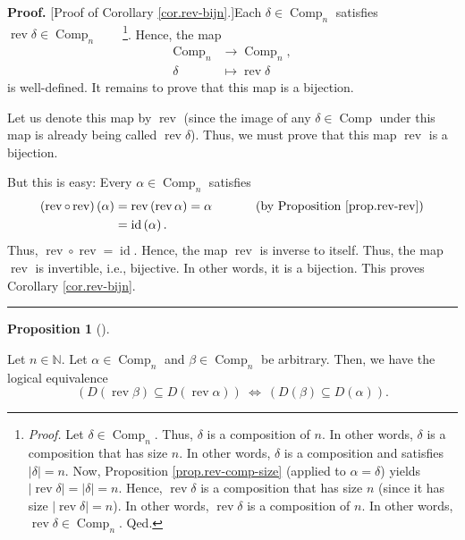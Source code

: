\documentclass[numbers=enddot,12pt,final,onecolumn,notitlepage]{scrartcl}%
\theoremstyle{definition}
\newtheorem{prop}[theo]{Proposition}
\newenvironment{proposition}[1][]
{\begin{prop}[#1]\begin{leftbar}}
{\end{leftbar}\end{prop}}
\newenvironment{proof}[1][Proof]{\noindent\textbf{#1.} }{\ \rule{0.5em}{0.5em}}
\begin{document}
\begin{proof}
[Proof of Corollary \ref{cor.rev-bijn}.]Each $\delta\in\operatorname*{Comp}%
\nolimits_{n}$ satisfies $\operatorname*{rev}\delta\in\operatorname*{Comp}%
\nolimits_{n}$\ \ \ \ \footnote{\textit{Proof.} Let $\delta\in
\operatorname*{Comp}\nolimits_{n}$. Thus, $\delta$ is a composition of $n$. In
other words, $\delta$ is a composition that has size $n$. In other words,
$\delta$ is a composition and satisfies $\left\vert \delta\right\vert =n$.
Now, Proposition \ref{prop.rev-comp-size} (applied to $\alpha=\delta$) yields
$\left\vert \operatorname*{rev}\delta\right\vert =\left\vert \delta\right\vert
=n$. Hence, $\operatorname*{rev}\delta$ is a composition that has size $n$
(since it has size $\left\vert \operatorname*{rev}\delta\right\vert =n$). In
other words, $\operatorname*{rev}\delta$ is a composition of $n$. In other
words, $\operatorname*{rev}\delta\in\operatorname*{Comp}\nolimits_{n}$. Qed.}.
Hence, the map%
\begin{align*}
\operatorname*{Comp}\nolimits_{n} &  \rightarrow\operatorname*{Comp}%
\nolimits_{n},\\
\delta &  \mapsto\operatorname*{rev}\delta
\end{align*}
is well-defined. It remains to prove that this map is a bijection.

Let us denote this map by $\operatorname*{rev}$ (since the image of any
$\delta\in\operatorname*{Comp}$ under this map is already being called
$\operatorname*{rev}\delta$). Thus, we must prove that this map
$\operatorname*{rev}$ is a bijection.

But this is easy: Every $\alpha\in\operatorname*{Comp}\nolimits_{n}$
satisfies
\begin{align*}
\left(  \operatorname*{rev}\circ\operatorname*{rev}\right)  \left(
\alpha\right)   &  =\operatorname*{rev}\left(  \operatorname*{rev}%
\alpha\right)  =\alpha\ \ \ \ \ \ \ \ \ \ \left(  \text{by Proposition
\ref{prop.rev-rev}}\right)  \\
&  =\operatorname*{id}\left(  \alpha\right)  .
\end{align*}
Thus, $\operatorname*{rev}\circ\operatorname*{rev}=\operatorname*{id}$. Hence,
the map $\operatorname*{rev}$ is inverse to itself. Thus, the map
$\operatorname*{rev}$ is invertible, i.e., bijective. In other words, it is a
bijection. This proves Corollary \ref{cor.rev-bijn}.
\end{proof}

\begin{proposition}
\label{prop.rev.D-inc}Let $n\in\mathbb{N}$. Let $\alpha\in\operatorname*{Comp}%
\nolimits_{n}$ and $\beta\in\operatorname*{Comp}\nolimits_{n}$ be arbitrary.
Then, we have the logical equivalence%
\[
\left(  D\left(  \operatorname*{rev}\beta\right)  \subseteq D\left(
\operatorname*{rev}\alpha\right)  \right)  \ \Longleftrightarrow\ \left(
D\left(  \beta\right)  \subseteq D\left(  \alpha\right)  \right)  .
\]

\end{proposition}
\end{document}
